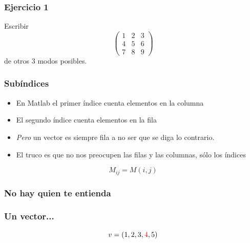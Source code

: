 \documentclass[12pt]{beamer}
\begin{document}

\begin{frame}
\frametitle{Ejercicio 1}
\testcode
Escribir 
\[ \left(
\begin{array}{ccc}
1&2&3\\
4&5&6\\
7&8&9
\end{array} \right)
\]
de otros 3 modos posibles.
\end{frame}

\begin{frame}
\frametitle{Subíndices}
\begin{itemize}
  \item En Matlab el primer índice cuenta elementos en la columna
  \item El segundo índice cuenta elementos en la fila
  \item \emph{Pero} un vector es siempre fila a no ser que se diga lo
    contrario.
  \item El truco es que no nos preocupen las filas y las columnas,
    sólo los índices
\end{itemize}
\[ M_{ij} = M(i,j) \]
\end{frame}

\begin{frame}
\frametitle{No hay quien te entienda}
\testcode
\end{frame}


\begin{frame}
\frametitle{Un vector...}
\[v = (1,2,3,\textcolor{red}{4},5) \]
\testcode
\end{frame}

\end{document}
